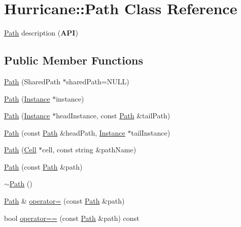 \hypertarget{classHurricane_1_1Path}{}\section{Hurricane\+:\+:Path Class Reference}
\label{classHurricane_1_1Path}


\mbox{\hyperlink{classHurricane_1_1Path}{Path}} description ({\bfseries A\+PI})  


\subsection*{Public Member Functions}
\begin{DoxyCompactItemize}
\item 
\mbox{\hyperlink{classHurricane_1_1Path_ad3fe735dcb2ce630f89b98c039663c23}{Path}} (Shared\+Path $\ast$shared\+Path=N\+U\+LL)
\item 
\mbox{\hyperlink{classHurricane_1_1Path_aa1a70f922b9b6a78fd3ac9b7bd94d158}{Path}} (\mbox{\hyperlink{classHurricane_1_1Instance}{Instance}} $\ast$instance)
\item 
\mbox{\hyperlink{classHurricane_1_1Path_a3197a114ed98117dde0f41d999917775}{Path}} (\mbox{\hyperlink{classHurricane_1_1Instance}{Instance}} $\ast$head\+Instance, const \mbox{\hyperlink{classHurricane_1_1Path}{Path}} \&tail\+Path)
\item 
\mbox{\hyperlink{classHurricane_1_1Path_add5812ab3bb9a4cf6dbe49d1e4e932cb}{Path}} (const \mbox{\hyperlink{classHurricane_1_1Path}{Path}} \&head\+Path, \mbox{\hyperlink{classHurricane_1_1Instance}{Instance}} $\ast$tail\+Instance)
\item 
\mbox{\hyperlink{classHurricane_1_1Path_a6e3d331f5c5a0dcb91d10516a4beb6bc}{Path}} (\mbox{\hyperlink{classHurricane_1_1Cell}{Cell}} $\ast$cell, const string \&path\+Name)
\item 
\mbox{\hyperlink{classHurricane_1_1Path_a8db875f788013ec5ad8ed517cf1e1715}{Path}} (const \mbox{\hyperlink{classHurricane_1_1Path}{Path}} \&path)
\item 
\mbox{\hyperlink{classHurricane_1_1Path_a6226639f50213598ffad86031afe69ff}{$\sim$\+Path}} ()
\item 
\mbox{\hyperlink{classHurricane_1_1Path}{Path}} \& \mbox{\hyperlink{classHurricane_1_1Path_a1355dd2d191d492a1b5e5180324a9f8f}{operator=}} (const \mbox{\hyperlink{classHurricane_1_1Path}{Path}} \&path)
\item 
bool \mbox{\hyperlink{classHurricane_1_1Path_a16a5b6529dd4424c55518ac9f687862f}{operator==}} (const \mbox{\hyperlink{classHurricane_1_1Path}{Path}} \&path) const

\end{DoxyCompactItemize}
